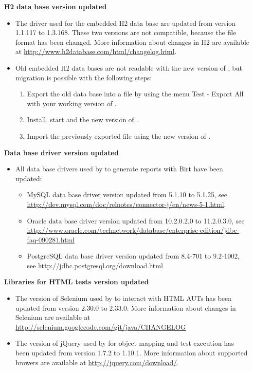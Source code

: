 %

\textbf{H2 data base version updated}
\begin{itemize}
\item The driver used for the embedded H2 data base are updated from version
    1.1.117 to 1.3.168. These two versions are not compatible, because the file format
    has been changed. More information about changes in H2 are
    available at \url{http://www.h2database.com/html/changelog.html}.
\item Old embedded H2 data bases are not readable with the new version
    of \ite, but migration is possible with the following steps:
    \begin{enumerate}
        \item Export the old data base into a file by using the menu
            Test - Export All with your working version of \ite.
        \item Install, start and the new version of \ite.
        \item Import the previously exported file using the new version
            of \ite.
    \end{enumerate}
\end{itemize}

\textbf{Data base driver version updated}
\begin{itemize}
\item All data base drivers used by \ite to generate reports with Birt have been
    updated:
    \begin{itemize}
    \item MySQL data base driver version updated from 5.1.10 to 5.1.25,
        see \url{http://dev.mysql.com/doc/relnotes/connector-j/en/news-5-1.html}.
    \item Oracle data base driver version updated from 10.2.0.2.0 to 11.2.0.3.0,
        see \url{http://www.oracle.com/technetwork/database/enterprise-edition/jdbc-faq-090281.html}
    \item PostgreSQL data base driver version updated from 8.4-701 to 9.2-1002,
        see \url{http://jdbc.postgresql.org/download.html}
    \end{itemize}
\end{itemize}

\textbf{Libraries for HTML tests version updated}
\begin{itemize}
\item The version of Selenium used by \ite to interact with HTML AUTs has been
    updated from version 2.30.0 to 2.33.0. More information about changes
    in Selenium are available at
    \url{http://selenium.googlecode.com/git/java/CHANGELOG}
\item The version of jQuery used by \ite for object mapping and test execution
    has been updated from version 1.7.2 to 1.10.1. More information about
    supported browers are available at \url{http://jquery.com/download/}.
\end{itemize}

